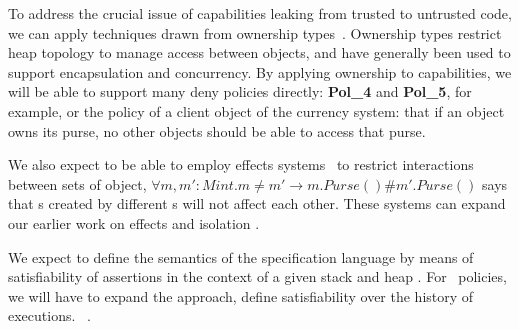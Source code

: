 To address the crucial issue of capabilities leaking from trusted to
untrusted code, we can apply techniques drawn from ownership types~\cite{ClaPotNobOOPSLA98,dynamicOwn,multiple,rolesForOwners}.
Ownership types restrict heap topology to manage access between
objects,
and have generally been used to support encapsulation and
concurrency.
By applying ownership to capabilities, we
will be able to support many deny policies directly:
{\bf Pol\_4} and {\bf Pol\_5}, for example, or the policy of a client
object of the currency system: that if an object owns its purse,
no other objects should be able to access that purse.



We also expect to be able to employ
effects systems~\cite{LuPotPOPL06} to restrict interactions between
sets of object, \eg $\forall m,m':Mint. m\neq m' \rightarrow m.Purse()
\# m'.Purse()$ says that s created by different s
will not affect each other. These systems can expand our earlier work
on effects and isolation \cite{ClaDroOOPLSA02,rolesForOwners}.



%
%
%
%


We expect to define the semantics of the specification language by
means of satisfiability of assertions in the context of a given stack
and heap \cite{MattAlex}.
 For \deny~policies, we will  have to expand the approach,
 define satisfiability over the history of executions.~ \cite{monitoring}.

